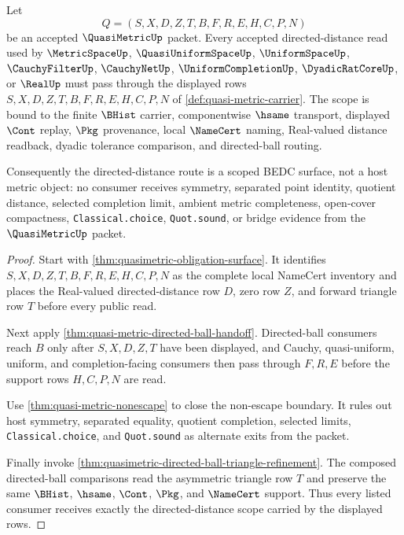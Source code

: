 \begin{theorem}
\label{thm:quasimetric-directed-distance-scope-upgrade}
Let
$$
Q=(S,X,D,Z,T,B,F,R,E,H,C,P,N)
$$
be an accepted $\QuasiMetricUp$ packet. Every accepted directed-distance read used by $\MetricSpaceUp$, $\QuasiUniformSpaceUp$, $\UniformSpaceUp$, $\CauchyFilterUp$, $\CauchyNetUp$, $\UniformCompletionUp$, $\DyadicRatCoreUp$, or $\RealUp$ must pass through the displayed rows $S,X,D,Z,T,B,F,R,E,H,C,P,N$ of \autoref{def:quasi-metric-carrier}. The scope is bound to the finite $\BHist$ carrier, componentwise $\hsame$ transport, displayed $\Cont$ replay, $\Pkg$ provenance, local $\NameCert$ naming, Real-valued distance readback, dyadic tolerance comparison, and directed-ball routing.

Consequently the directed-distance route is a scoped BEDC surface, not a host metric object: no consumer receives symmetry, separated point identity, quotient distance, selected completion limit, ambient metric completeness, open-cover compactness, \texttt{Classical.choice}, \texttt{Quot.sound}, or bridge evidence from the $\QuasiMetricUp$ packet.
\end{theorem}
\begin{proof}
Start with \autoref{thm:quasimetric-obligation-surface}. It identifies $S,X,D,Z,T,B,F,R,E,H,C,P,N$ as the complete local NameCert inventory and places the Real-valued directed-distance row $D$, zero row $Z$, and forward triangle row $T$ before every public read.

Next apply \autoref{thm:quasi-metric-directed-ball-handoff}. Directed-ball consumers reach $B$ only after $S,X,D,Z,T$ have been displayed, and Cauchy, quasi-uniform, uniform, and completion-facing consumers then pass through $F,R,E$ before the support rows $H,C,P,N$ are read.

Use \autoref{thm:quasi-metric-nonescape} to close the non-escape boundary. It rules out host symmetry, separated equality, quotient completion, selected limits, \texttt{Classical.choice}, and \texttt{Quot.sound} as alternate exits from the packet.

Finally invoke \autoref{thm:quasimetric-directed-ball-triangle-refinement}. The composed directed-ball comparisons read the asymmetric triangle row $T$ and preserve the same $\BHist$, $\hsame$, $\Cont$, $\Pkg$, and $\NameCert$ support. Thus every listed consumer receives exactly the directed-distance scope carried by the displayed rows.
\end{proof}

